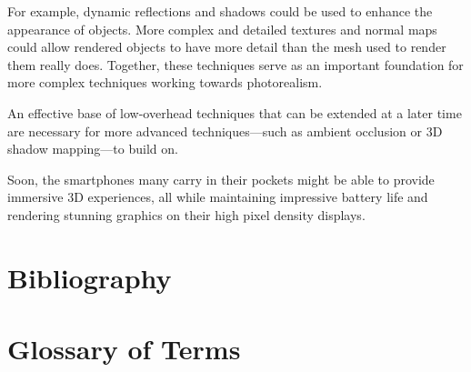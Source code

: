 \documentclass[11pt, oneside]{report}
\begin{document}
For example, dynamic reflections and shadows could be used to enhance the appearance of objects. More complex and detailed textures and normal maps could allow rendered objects to have more detail than the mesh used to render them really does. Together, these techniques serve as an important foundation for more complex techniques working towards photorealism.

An effective base of low-overhead techniques that can be extended at a later time are necessary for more advanced techniques---such as ambient occlusion or 3D shadow mapping---to build on.

Soon, the smartphones many carry in their pockets might be able to provide immersive 3D experiences, all while maintaining impressive battery life and rendering stunning graphics on their high pixel density displays.
	
\begingroup	
	\setlength\bibitemsep{18pt}
	
	\chapter{Bibliography}
	\printbibliography[heading=none]
\endgroup


\begingroup
	\renewcommand{\glossarysection}[2][]{}
	
	\chapter{Glossary of Terms}
	\printglossaries
\endgroup
\end{document}
